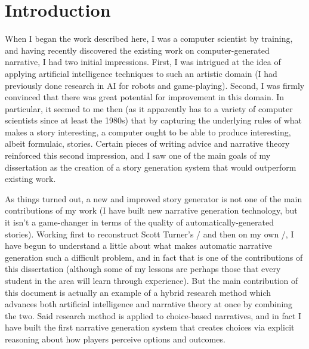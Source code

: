 \chapter{Introduction}

\label{ch:intro}

When I began the work described here, I was a computer scientist by training, and having recently discovered the existing work on computer-generated narrative, I had two initial impressions.
%
First, I was intrigued at the idea of applying artificial intelligence techniques to such an artistic domain (I had previously done research in AI for robots and game-playing).
%
Second, I was firmly convinced that there was great potential for improvement in this domain.
%
In particular, it seemed to me then (as it apparently has to a variety of computer scientists since at least the 1980s) that by capturing the underlying rules of what makes a story interesting, a computer ought to be able to produce interesting, albeit formulaic, stories.
%
Certain pieces of writing advice and narrative theory reinforced this second impression, and I saw one of the main goals of my dissertation as the creation of a story generation system that would outperform existing work.


As things turned out, a new and improved story generator is not one of the main contributions of my work (I have built new narrative generation technology, but it isn't a game-changer in terms of the quality of automatically-generated stories).
%
Working first to reconstruct Scott Turner's \minstrel/ \citep{Turner1993} and then on my own \dunyazad/, I have begun to understand a little about what makes automatic narrative generation such a difficult problem, and in fact that is one of the contributions of this dissertation (although some of my lessons are perhaps those that every student in the area will learn through experience).
%
But the main contribution of this document is actually an example of a hybrid research method which advances both artificial intelligence and narrative theory at once by combining the two.
%
Said research method is applied to choice-based narratives, and in fact I have built the first narrative generation system that creates choices via explicit reasoning about how players perceive options and outcomes.


